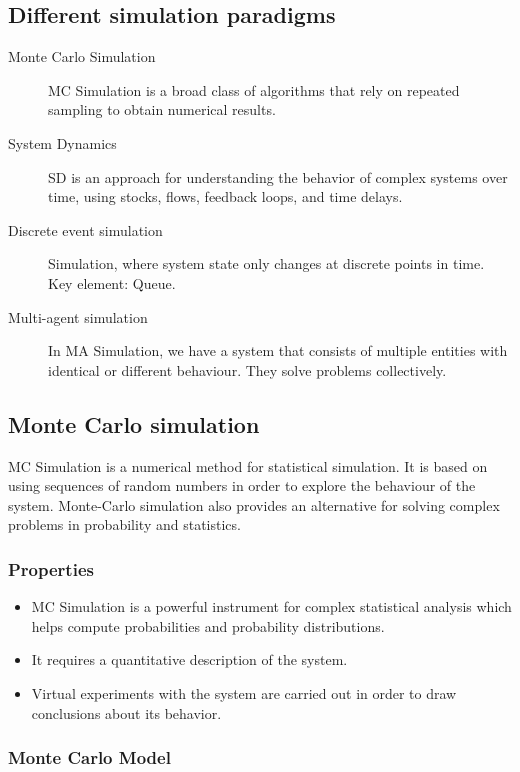 \subsection{Different simulation paradigms}

\begin{description}
	\item[Monte Carlo Simulation] MC Simulation is a broad class of algorithms
	that rely on repeated sampling to obtain numerical results.
	\item[System Dynamics] SD is an approach for understanding the behavior of
	complex systems over time, using stocks, flows, feedback loops, and time
	delays.
	\item[Discrete event simulation] Simulation, where system state only changes
	at discrete points in time.\\
	Key element: Queue.
	\item[Multi-agent simulation] In MA Simulation, we have a system that
	consists of multiple entities with identical or different behaviour.
	They solve problems collectively.
\end{description}

\subsection{Monte Carlo simulation}

MC Simulation is a numerical method for statistical simulation. It is
based on using sequences of random numbers in order to explore the
behaviour of the system. Monte-Carlo simulation also provides an
alternative for solving complex problems in probability and statistics.

\subsubsection{Properties}

\begin{itemize}
	\tightlist
	\item MC Simulation is a powerful instrument for complex statistical
	analysis which helps compute probabilities and probability
	distributions.
	\item It requires a quantitative description of the system.
	\item Virtual experiments with the system are carried out in order to draw
	conclusions about its behavior.
\end{itemize}


\subsubsection{Monte Carlo Model}

